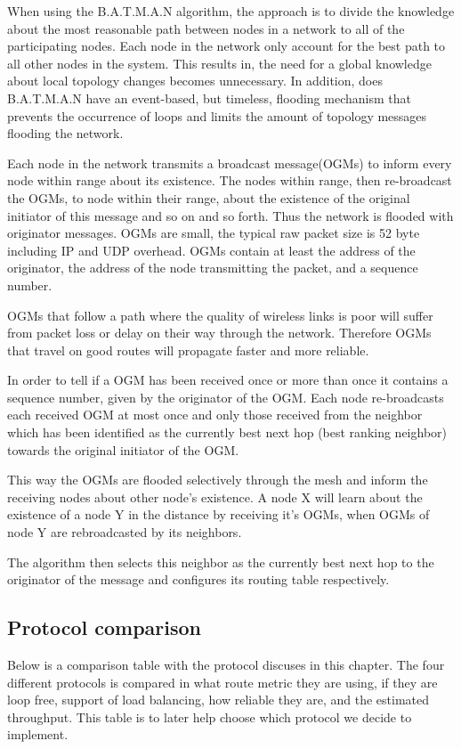 When using the B.A.T.M.A.N algorithm, the approach is to divide the knowledge about the most reasonable path between nodes in a network to all of the participating nodes.
Each node in the network only account for the best path to all other nodes in the system.
This results in, the need for a global knowledge about local topology changes becomes unnecessary.
In addition, does B.A.T.M.A.N have an event-based, but timeless, flooding mechanism that prevents the occurrence of loops and limits the amount of topology messages flooding the network.

Each node in the network transmits a broadcast message(OGMs) to inform every node within range about its existence.
The nodes within range, then re-broadcast the OGMs, to node within their range, about the existence of the original initiator of this message and so on and so forth.
Thus the network is flooded with originator messages. OGMs are small, the typical raw packet size is 52 byte including IP and UDP overhead.
OGMs contain at least the address of the originator, the address of the node transmitting the packet, and a sequence number.

OGMs that follow a path where the quality of wireless links is poor will suffer from packet loss or delay on their way through the network.
Therefore OGMs that travel on good routes will propagate faster and more reliable.

In order to tell if a OGM has been received once or more than once it contains a sequence number, given by the originator of the OGM.
Each node re-broadcasts each received OGM at most once and only those received from the neighbor which has been identified as the currently best next hop (best ranking neighbor) towards the original initiator of the OGM.

This way the OGMs are flooded selectively through the mesh and inform the receiving nodes about other node's existence. 
A node X will learn about the existence of a node Y in the distance by receiving it's OGMs, when OGMs of node Y are rebroadcasted by its neighbors.

The algorithm then selects this neighbor as the currently best next hop to the originator of the message and configures its routing table respectively\cite{BATMAN}.

\subsection{Protocol comparison}
Below is a comparison table with the protocol discuses in this chapter.
The four different protocols is compared in what route metric they are using, if they are loop free, support of load balancing, how reliable they are, and the estimated throughput.
This table is to later help choose which protocol we decide to implement.

